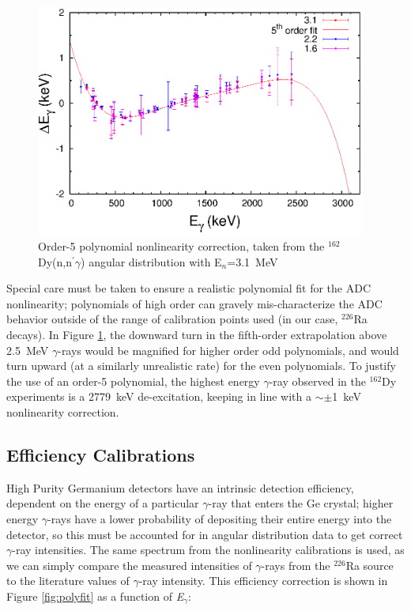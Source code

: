 \begin{figure}[ht]
\begin{center}
\includegraphics[width=0.97\textwidth]{figures/310_dsnonlin_color.eps}
\caption{Order-5 polynomial nonlinearity correction, taken from the $^{162}$Dy(n,n$^{\prime}\gamma$) angular distribution with E$_n$=3.1~MeV}
\label{fig:dsnonlin}
\end{center}
\end{figure}
Special care must be taken to ensure a realistic polynomial fit for the ADC nonlinearity; polynomials of high order can gravely mis-characterize the ADC behavior outside of the range of calibration points used (in our case, $^{226}$Ra decays). In Figure \ref{fig:dsnonlin}, the downward turn in the fifth-order extrapolation above 2.5~MeV $\gamma$-rays would be magnified for higher order odd polynomials, and would turn upward (at a similarly unrealistic rate) for the even polynomials. To justify the use of an order-5 polynomial, the highest energy $\gamma$-ray observed in the $^{162}$Dy experiments is a 2779~keV de-excitation, keeping in line with a $\sim\pm$1~keV nonlinearity correction.
\subsection{Efficiency Calibrations}\label{sec:efficiency_calibration}
High Purity Germanium detectors have an intrinsic detection efficiency, dependent on the energy of a particular $\gamma$-ray that enters the Ge crystal; higher energy $\gamma$-rays have a lower probability of depositing their entire energy into the detector, so this must be accounted for in angular distribution data to get correct $\gamma$-ray intensities. The same spectrum from the nonlinearity calibrations is used, as we can simply compare the measured intensities of $\gamma$-rays from the $^{226}$Ra source to the literature values of $\gamma$-ray intensity. This efficiency correction is shown in Figure \ref{fig:polyfit} as a function of \textit{E$_\gamma$}:

